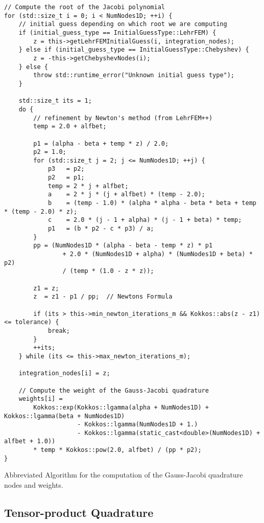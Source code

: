 \begin{Code}
    \small
    \begin{verbatim}
// Compute the root of the Jacobi polynomial
for (std::size_t i = 0; i < NumNodes1D; ++i) {
    // initial guess depending on which root we are computing
    if (initial_guess_type == InitialGuessType::LehrFEM) {
        z = this->getLehrFEMInitialGuess(i, integration_nodes);
    } else if (initial_guess_type == InitialGuessType::Chebyshev) {
        z = -this->getChebyshevNodes(i);
    } else {
        throw std::runtime_error("Unknown initial guess type");
    }

    std::size_t its = 1;
    do {
        // refinement by Newton's method (from LehrFEM++)
        temp = 2.0 + alfbet;

        p1 = (alpha - beta + temp * z) / 2.0;
        p2 = 1.0;
        for (std::size_t j = 2; j <= NumNodes1D; ++j) {
            p3   = p2;
            p2   = p1;
            temp = 2 * j + alfbet;
            a    = 2 * j * (j + alfbet) * (temp - 2.0);
            b    = (temp - 1.0) * (alpha * alpha - beta * beta + temp * (temp - 2.0) * z);
            c    = 2.0 * (j - 1 + alpha) * (j - 1 + beta) * temp;
            p1   = (b * p2 - c * p3) / a;
        }
        pp = (NumNodes1D * (alpha - beta - temp * z) * p1
                + 2.0 * (NumNodes1D + alpha) * (NumNodes1D + beta) * p2)
                / (temp * (1.0 - z * z));

        z1 = z;
        z  = z1 - p1 / pp;  // Newtons Formula

        if (its > this->min_newton_iterations_m && Kokkos::abs(z - z1) <= tolerance) {
            break;
        }
        ++its;
    } while (its <= this->max_newton_iterations_m);

    integration_nodes[i] = z;

    // Compute the weight of the Gauss-Jacobi quadrature
    weights[i] =
        Kokkos::exp(Kokkos::lgamma(alpha + NumNodes1D) + Kokkos::lgamma(beta + NumNodes1D)
                    - Kokkos::lgamma(NumNodes1D + 1.)
                    - Kokkos::lgamma(static_cast<double>(NumNodes1D) + alfbet + 1.0))
        * temp * Kokkos::pow(2.0, alfbet) / (pp * p2);
}
    \end{verbatim}
    \caption{Abbreviated Algorithm for the computation of the Gauss-Jacobi quadrature nodes and weights.}
    \label{alg:gauss_jac}
\end{Code}


\subsection{Tensor-product Quadrature}

